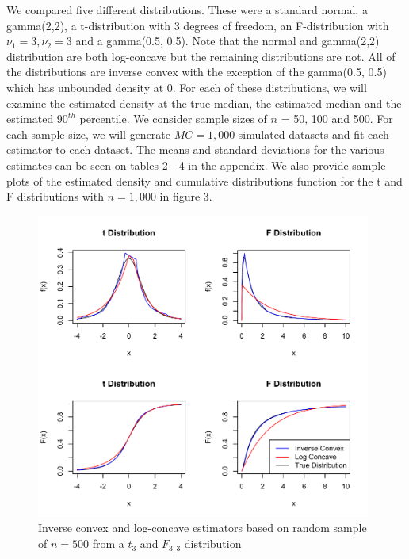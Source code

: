 \documentclass[11pt]{article}
\numberwithin{equation}{section}
\begin{document}
	We compared five different distributions. These were a standard normal, a gamma(2,2), a t-distribution with 3 degrees of freedom, an F-distribution with $\nu_1 = 3, \nu_2 = 3$ and a gamma(0.5, 0.5). Note that the normal and gamma(2,2) distribution are both log-concave but the remaining distributions are not. All of the distributions are inverse convex with the exception of the gamma(0.5, 0.5) which has unbounded density at 0. For each of these distributions, we will examine the estimated density at the true median, the estimated median and the estimated $90^{th}$ percentile. We consider sample sizes of $n$ = 50, 100 and 500. For each sample size, we will generate $MC = 1,000$ simulated datasets and fit each estimator to each dataset.  The means and standard deviations for the various estimates can be seen on tables 2 - 4 in the appendix. We also provide sample plots of the estimated density and cumulative distributions function for the t and F distributions with $n = 1,000$ in figure 3. 
	
	\begin{figure}[H]
	\centerline{\includegraphics[width = 11cm]{SamplePlots.pdf} }
	\caption[Inverse Convex and Log-concave Estimators for Simulated Data]{Inverse convex and log-concave estimators based on random sample of $n= 500$ from a $t_3$ and $F_{3,3}$ distribution }
	\end{figure} 
\end{document}
